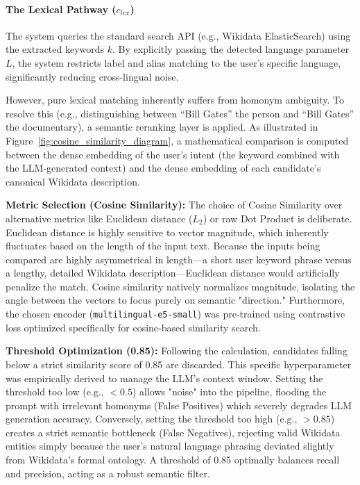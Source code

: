 \paragraph{The Lexical Pathway ($c_{lex}$)} 
The system queries the standard search API (e.g., Wikidata ElasticSearch) using the extracted keywords $k$. By explicitly passing the detected language parameter $L$, the system restricts label and alias matching to the user's specific language, significantly reducing cross-lingual noise. 

However, pure lexical matching inherently suffers from homonym ambiguity. To resolve this (e.g., distinguishing between ``Bill Gates'' the person and ``Bill Gates'' the documentary), a semantic reranking layer is applied. As illustrated in Figure~\ref{fig:cosine_similarity_diagram}, a mathematical comparison is computed between the dense embedding of the user's intent (the keyword combined with the LLM-generated context) and the dense embedding of each candidate's canonical Wikidata description.

\textbf{Metric Selection (Cosine Similarity):} The choice of Cosine Similarity over alternative metrics like Euclidean distance ($L_2$) or raw Dot Product is deliberate. Euclidean distance is highly sensitive to vector magnitude, which inherently fluctuates based on the length of the input text. Because the inputs being compared are highly asymmetrical in length—a short user keyword phrase versus a lengthy, detailed Wikidata description—Euclidean distance would artificially penalize the match. Cosine similarity natively normalizes magnitude, isolating the angle between the vectors to focus purely on semantic "direction." Furthermore, the chosen encoder (\texttt{multilingual-e5-small}) was pre-trained using contrastive loss optimized specifically for cosine-based similarity search.

\textbf{Threshold Optimization (0.85):} Following the calculation, candidates falling below a strict similarity score of 0.85 are discarded. This specific hyperparameter was empirically derived to manage the LLM's context window. Setting the threshold too low (e.g., $<0.5$) allows "noise" into the pipeline, flooding the prompt with irrelevant homonyms (False Positives) which severely degrades LLM generation accuracy. Conversely, setting the threshold too high (e.g., $>0.85$) creates a strict semantic bottleneck (False Negatives), rejecting valid Wikidata entities simply because the user's natural language phrasing deviated slightly from Wikidata's formal ontology. A threshold of 0.85 optimally balances recall and precision, acting as a robust semantic filter.

